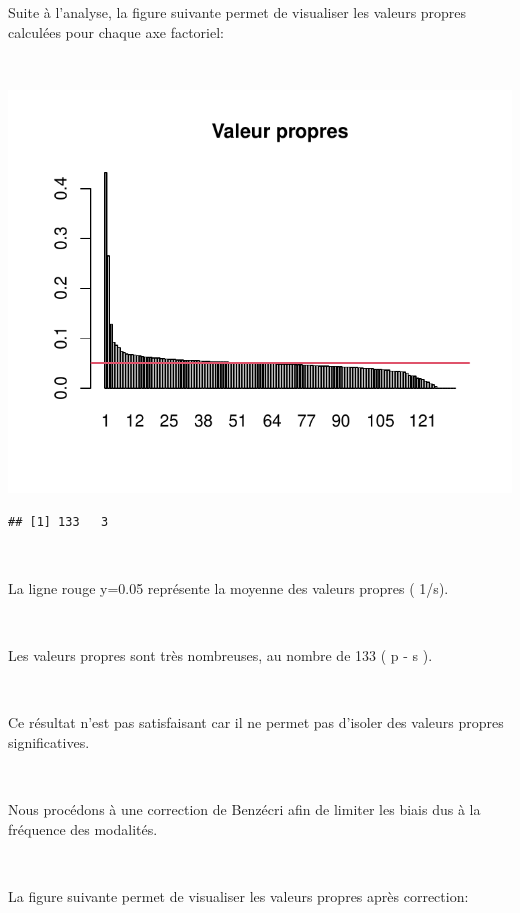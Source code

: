 \documentclass[]{imsart}
\numberwithin{equation}{section}
\theoremstyle{plain}
\begin{document}
Suite à l'analyse, la figure suivante permet de visualiser les valeurs propres calculées pour chaque axe factoriel:

~

\begin{flushleft}\includegraphics{Analyse_Exploratoire_Projet_files/figure-latex/unnamed-chunk-31-1} \end{flushleft}

\begin{verbatim}
## [1] 133   3
\end{verbatim}

~

La ligne rouge y=0.05 représente la moyenne des valeurs propres ( 1/s).

~

Les valeurs propres sont très nombreuses, au nombre de 133 ( p - s ).

~

Ce résultat n'est pas satisfaisant car il ne permet pas d'isoler des valeurs propres significatives.

~

Nous procédons à une correction de Benzécri afin de limiter les biais dus à la fréquence des modalités.

~

La figure suivante permet de visualiser les valeurs propres après correction:

~
\end{document}
